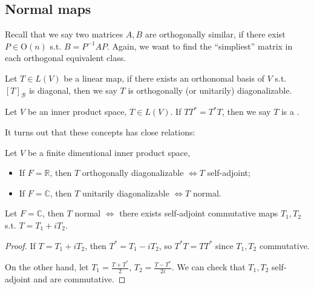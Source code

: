 \subsection{Normal maps}
\label{sub:Normal maps}
Recall that we say two matrices $A, B$ are orthogonally
similar, if there exist $P\in \mathrm{O}(n)$ s.t. $B = P^{-1} A P$.
Again, we want to find the ``simpliest'' matrix in each orthogonal
equivalent class.

Let $T\in L(V)$ be a linear map, if there exists an orthonomal basis
of $V$ s.t. $[T]_{\mathcal{B}}$ is diagonal, then we say $T$ is
orthogonally (or unitarily) diagonalizable.

\begin{definition}
	Let $V$ be an inner product space, $T\in L(V)$.
	If $TT^* = T^*T$, then we say $T$ is a .
\end{definition}

It turns out that these concepts has close relations:
\begin{theorem}
	\label{thm:3.2}
    Let $V$ be a finite dimentional inner product space,
	\begin{itemize}
		\item If $F = \mathbb{R}$, then $T$ orthogonally diagonalizable
			$\iff T$ self-adjoint;
		\item If $F = \mathbb{C}$, then $T$ unitarily diagonalizable
			$\iff T$ normal.
	\end{itemize}
\end{theorem}

\begin{lemma}
	Let $F = \mathbb{C}$, then $T$ normal $\iff$ there exists self-adjoint commutative
	maps $T_1, T_2$ s.t. $T = T_1 + iT_2$.
\end{lemma}
\begin{proof}[Proof]
    If $T = T_1 + iT_2$, then $T^* = T_1 - iT_2$,
	so $T^* T = TT^*$ since $T_1, T_2$ commutative.

	On the other hand, let $T_1 = \frac{T+T^*}{2}$, $T_2 = \frac{T-T^*}{2i}$.
	We can check that $T_1, T_2$ self-adjoint and are commutative.
\end{proof}

